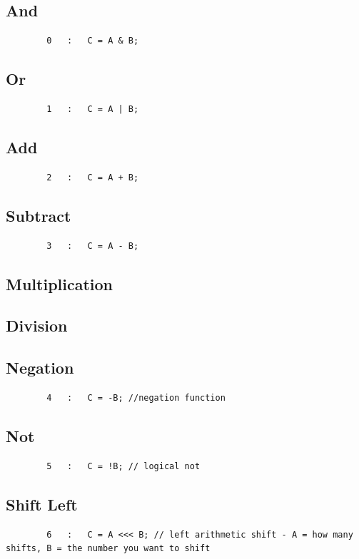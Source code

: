 \documentclass{article}
\begin{document}
    \subsection{And}
        \begin{lstlisting}
        0   :   C = A & B;
        \end{lstlisting}
    \subsection{Or}
        \begin{lstlisting}
		1   :   C = A | B;
        \end{lstlisting}
    \subsection{Add}
        \begin{lstlisting}
        2   :   C = A + B;
        \end{lstlisting}
    \subsection{Subtract}
        \begin{lstlisting}
		3   :   C = A - B;
        \end{lstlisting}
    \subsection{Multiplication}
        \label{MUL_ALG}
    \subsection{Division}
        \label{DIV_ALG}
    \subsection{Negation}
        \begin{lstlisting}
        4   :   C = -B; //negation function
        \end{lstlisting}
    \subsection{Not}
        \begin{lstlisting}
        5   :   C = !B; // logical not 
        \end{lstlisting}
    \subsection{Shift Left}
        \begin{lstlisting}
        6   :   C = A <<< B; // left arithmetic shift - A = how many shifts, B = the number you want to shift 
        \end{lstlisting}
\end{document}
